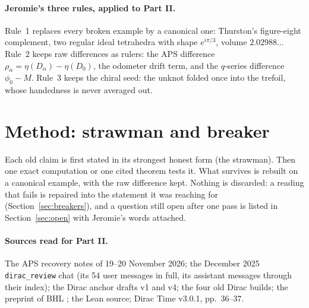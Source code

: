 \documentclass[11pt]{article}
\theoremstyle{definition}
\begin{document}
\paragraph{Jeromie's three rules, applied to Part II.} Rule~1 replaces every broken example by a canonical one: Thurston's figure-eight complement, two regular ideal tetrahedra with shape $e^{i\pi/3}$, volume $2.02988\ldots$ Rule~2 keeps raw differences as rulers: the APS difference $\rho_\alpha=\eta(D_\alpha)-\eta(D_0)$, the odometer drift term, and the $q$-series difference $\phi_0-M$. Rule~3 keeps the chiral seed: the unknot folded once into the trefoil, whose handedness is never averaged out.

\section{Method: strawman and breaker}
Each old claim is first stated in its strongest honest form (the strawman). Then one exact computation or one cited theorem tests it. What survives is rebuilt on a canonical example, with the raw difference kept. Nothing is discarded: a reading that fails is repaired into the statement it was reaching for (Section~\ref{sec:breakers}), and a question still open after one pass is listed in Section~\ref{sec:open} with Jeromie's words attached.

\paragraph{Sources read for Part II.} The APS recovery notes of 19--20 November 2026; the December 2025 \texttt{dirac\_review} chat (its 54 user messages in full, its assistant messages through their index); the Dirac anchor drafts v1 and v4; the four old Dirac builds; the preprint of BHL \cite{BHL}; the Lean source; Dirac Time v3.0.1, pp.~36--37.
\end{document}
